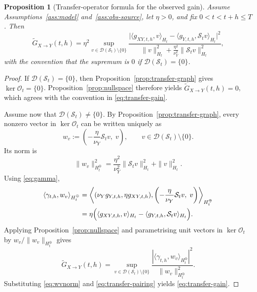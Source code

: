 \documentclass[11pt,a4paper]{amsart}
\theoremstyle{plain}
\newtheorem{proposition}[theorem]{Proposition}
\theoremstyle{definition}
\theoremstyle{remark}
\begin{document}
\begin{proposition}[Transfer-operator formula for the observed gain]
\label{prop:transfer-gain}
Assume Assumptions~\ref{ass:model} and~\ref{ass:obs-source}, let $\eta>0$, and fix
$0<t<t+h\le T$. Then
\begin{equation}\label{eq:transfer-gain}
\widetilde G_{X\to Y}(t,h)
=
\eta^2
\sup_{v\in\mathcal D(\mathcal S_t)\setminus\{0\}}
\frac{
\bigl|
\langle g_{XY,t,h},v\rangle_{H_t}
-\langle g_{Y,t,h},\mathcal S_t v\rangle_{H_t}
\bigr|^2
}{
\|v\|_{H_t}^2+\frac{\eta^2}{\nu_Y^2}\|\mathcal S_t v\|_{H_t}^2
},
\end{equation}
with the convention that the supremum is $0$ if $\mathcal D(\mathcal S_t)=\{0\}$.
\end{proposition}

\begin{proof}
If $\mathcal D(\mathcal S_t)=\{0\}$, then Proposition~\ref{prop:transfer-graph} gives
$\ker \mathcal O_t=\{0\}$. Proposition~\ref{prop:nullspace} therefore yields
$\widetilde G_{X\to Y}(t,h)=0$, which agrees with the convention in
\eqref{eq:transfer-gain}.

Assume now that $\mathcal D(\mathcal S_t)\neq\{0\}$. By
Proposition~\ref{prop:transfer-graph}, every nonzero vector in $\ker \mathcal O_t$ can be
written uniquely as
\[
w_v:=\left(-\frac{\eta}{\nu_Y}\mathcal S_t v,\; v\right),
\qquad
v\in\mathcal D(\mathcal S_t)\setminus\{0\}.
\]
Its norm is
\begin{equation}\label{eq:wvnorm}
\|w_v\|_{H_t^\oplus}^2
=
\frac{\eta^2}{\nu_Y^2}\|\mathcal S_t v\|_{H_t}^2+\|v\|_{H_t}^2.
\end{equation}
Using \eqref{eq:gamma},
\begin{align}
\langle \gamma_{t,h},w_v\rangle_{H_t^\oplus}
&=
\left\langle
(\nu_Y g_{Y,t,h},\eta g_{XY,t,h}),
\left(-\frac{\eta}{\nu_Y}\mathcal S_t v,\; v\right)
\right\rangle_{H_t^\oplus} \notag\\
&=
\eta\Bigl(
\langle g_{XY,t,h},v\rangle_{H_t}
-\langle g_{Y,t,h},\mathcal S_t v\rangle_{H_t}
\Bigr). \label{eq:transfer-pairing}
\end{align}
Applying Proposition~\ref{prop:nullspace} and parametrising unit vectors in
$\ker \mathcal O_t$ by $w_v/\|w_v\|_{H_t^\oplus}$ gives
\[
\widetilde G_{X\to Y}(t,h)
=
\sup_{v\in\mathcal D(\mathcal S_t)\setminus\{0\}}
\frac{
|\langle \gamma_{t,h},w_v\rangle_{H_t^\oplus}|^2
}{
\|w_v\|_{H_t^\oplus}^2
}.
\]
Substituting \eqref{eq:wvnorm} and \eqref{eq:transfer-pairing} yields
\eqref{eq:transfer-gain}.
\end{proof}
\end{document}
